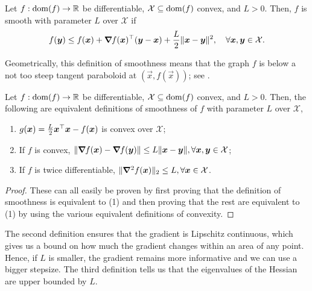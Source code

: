 \begin{definition}[Smoothness] \label{def:smoothness}
    Let $f: \mathrm{dom}(f) \to \mathbb{R}$ be differentiable, $\mathcal{X} \subseteq \mathrm{dom}(f)$ convex, and $L > 0$.
    Then, $f$ is smooth with parameter $L$ over $\mathcal{X}$ if \[
        f(\bm{y}) \leq f(\bm{x}) + \bm{\nabla}_{\! } f(\bm{x})^\top (\bm{y}-\bm{x}) + \frac{L}{2} \|\bm{x}-\bm{y}\|^2, \quad \forall \bm{x}, \bm{y} \in \mathcal{X}.
    \]
\end{definition}

Geometrically, this definition of smoothness means that the graph $f$ is below a not too steep
tangent paraboloid at $(\vec{x},f(\vec{x}))$; see .

\begin{lemma}
    Let $f: \mathrm{dom}(f) \to \mathbb{R}$ be differentiable, $\mathcal{X} \subseteq \mathrm{dom}(f)$ convex, and $L > 0$.
    Then, the following are equivalent definitions of smoothness of $f$ with parameter $L$ over $\mathcal{X}$,
    \begin{enumerate}
        \item $g(\bm{x}) = \frac{L}{2} \bm{x}^\top \bm{x} - f(\bm{x})$ is convex over $\mathcal{X}$;
        \item If $f$ is convex, $\| \bm{\nabla}_{\! } f(\bm{x}) - \bm{\nabla}_{\! } f(\bm{y}) \| \leq L \| \bm{x} - \bm{y} \|,
                  \forall \bm{x}, \bm{y} \in \mathcal{X}$;
        \item If $f$ is twice differentiable, $\| \bm{\nabla}^2_{\! } f(\bm{x}) \|_2 \leq L, \forall \bm{x} \in
                  \mathcal{X}$.
    \end{enumerate}
\end{lemma}

\begin{proof}
    These can all easily be proven by first proving that the definition of smoothness is equivalent
    to (1) and then proving that the rest are equivalent to (1) by using the various equivalent
    definitions of convexity.
\end{proof}

The second definition ensures that the gradient is Lipschitz continuous, which gives us a bound on
how much the gradient changes within an area of any point. Hence, if $L$ is smaller, the gradient
remains more informative and we can use a bigger stepsize. The third definition tells us that the
eigenvalues of the Hessian are upper bounded by $L$.

